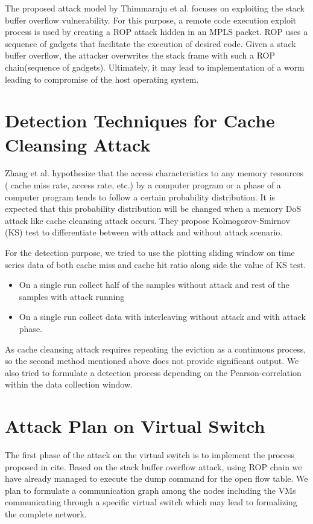 \documentclass[a4paper,10pt]{article}
\begin{document}
The proposed attack model by Thimmaraju et al. focuses on exploiting the stack buffer overflow vulnerability. For this purpose, a remote code execution exploit process is used by creating a ROP attack hidden in an MPLS packet. ROP uses a sequence of gadgets that facilitate the execution of desired code. Given a stack buffer overflow, the attacker overwrites the stack frame with such a ROP chain(sequence of gadgets). Ultimately, it may lead to implementation of a worm leading to compromise of the host operating system.

\medskip

\section{Detection Techniques for Cache Cleansing Attack}
\label{sec:det}
Zhang et al.\cite{cacheCleansing} hypothesize that the access characteristics to any memory resources ( cache miss rate, access rate, etc.) by a computer program or a phase of a computer program tends to follow a certain probability distribution. It is expected that this probability distribution will be changed when a memory DoS attack like cache cleansing attack occurs. They propose Kolmogorov-Smirnov (KS) test to differentiate between with attack and without attack scenario. 

For the detection purpose, we tried to use the plotting sliding window on time series data of both cache miss and cache hit ratio along side the value of KS test. 
\begin{itemize}
\item On a single run collect half of the samples without attack and rest of the samples with attack running
\item On a single run collect data with interleaving without attack and with attack phase.
\end{itemize}

As cache cleansing attack requires repeating the eviction as a continuous process, so the second method mentioned above does not provide significant output. We also tried to formulate a detection process depending on the Pearson-correlation within the data collection window.
\medskip

\section{Attack Plan on Virtual Switch}
The first phase of the attack on the virtual switch is to implement the process proposed in cite. Based on the stack buffer overflow attack, using ROP chain we have already managed to execute the dump command for the open flow table. We plan to formulate a communication graph among the nodes including the VMs communicating through a specific virtual switch which may lead to formalizing the complete network.
\end{document}
